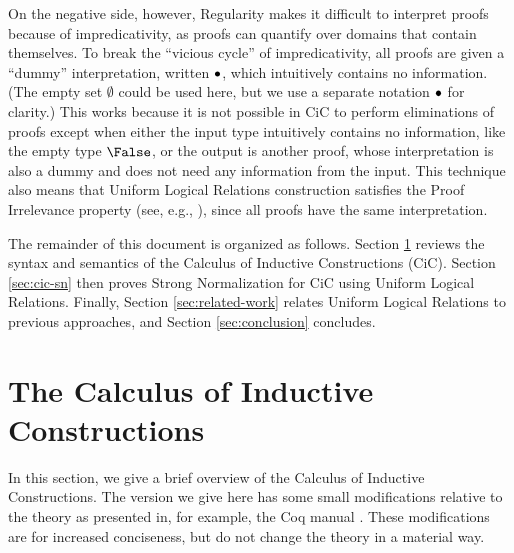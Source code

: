 \documentclass{article}
\begin{document}
On the negative side, however, Regularity makes it difficult to
interpret proofs because of impredicativity, as proofs can quantify
over domains that contain themselves. To break the ``vicious cycle''
of impredicativity, all proofs are given a ``dummy'' interpretation,
written $\bullet$, which intuitively contains no information.  (The
empty set $\emptyset$ could be used here, but we use a separate
notation $\bullet$ for clarity.)  This works because it is not possible
in CiC to perform eliminations of proofs except when either the input
type intuitively contains no information, like the empty type
$\False$, or the output is another proof, whose interpretation
is also a dummy and does not need any information from the input.
This technique also means that Uniform Logical Relations construction
satisfies the Proof Irrelevance property (see, e.g., \cite{miquel02}),
since all proofs have the same interpretation.


The remainder of this document is organized as follows. Section
\ref{sec:cic} reviews the syntax and semantics of the Calculus of
Inductive Constructions (CiC).  Section \ref{sec:cic-sn} then proves
Strong Normalization for CiC using Uniform Logical Relations.
Finally, Section \ref{sec:related-work} relates Uniform Logical
Relations to previous approaches, and Section \ref{sec:conclusion}
concludes.



\section{The Calculus of Inductive Constructions}
\label{sec:cic}

In this section, we give a brief overview of the Calculus of Inductive
Constructions. The version we give here has some small modifications
relative to the theory as presented in, for example, the Coq manual
\cite{coq}. These modifications are for increased conciseness, but do
not change the theory in a material way.
\end{document}
